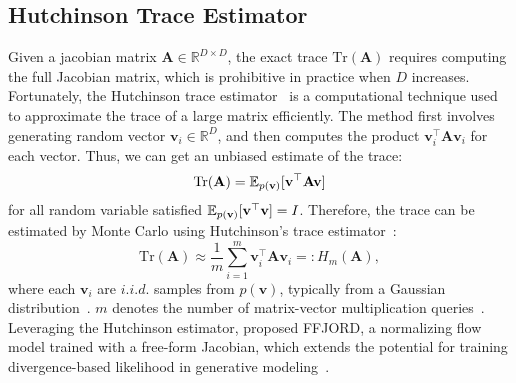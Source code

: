 \subsection{Hutchinson Trace Estimator}\label{sec: Hutchinson}
Given a jacobian matrix $\mathbf{A} \in \mathbb{R}^{D \times D}$, the exact trace $\mathrm{Tr}(\mathbf{A})$ requires computing the full Jacobian matrix,
which is prohibitive in practice when $D$ increases.
Fortunately, the Hutchinson trace estimator~\citep{Hutchinson89} is a computational technique used to approximate the trace of a large matrix efficiently. 
The method first involves generating random vector $\mathbf{v}_i \in \mathbb{R}^D$, and then computes the product $\mathbf{v}_i^\top \mathbf{A} \mathbf{v}_i$ for each vector. 
Thus, we can get an unbiased estimate of the trace:
\begin{equation}\label{eq: hutchinson_unbaised}
    \mathrm{Tr}(\mathbf{A}) = \mathbb{E}_{p(\mathbf{v})}[\mathbf{v}^\top\mathbf{A}\mathbf{v}]
\end{equation}
for all random variable satisfied $\mathbb{E}_{p(\mathbf{v})}[\mathbf{v}^\top\mathbf{v}] = I$. 
Therefore, the trace can be estimated by Monte Carlo using Hutchinson's trace estimator~\citep{Hutchinson89}:
\begin{equation}\label{eq: hutchinson}
    \mathrm{Tr}(\mathbf{A}) \approx \frac{1}{m} \sum_{i=1}^{m} \mathbf{v}_i^\top \mathbf{A} \mathbf{v}_i=:H_m(\mathbf{A}),
\end{equation}
where each $\mathbf{v}_i$ are $i.i.d.$ samples from $p(\mathbf{v})$, typically from a Gaussian distribution~\citep{Hutchinson89}. 
$m$ denotes the number of matrix-vector multiplication queries~\citep{avron2011matrixvector1, roosta2015matrixvector2}.
Leveraging the Hutchinson estimator, \citet{FFJORD} proposed FFJORD, a normalizing flow model trained with a free-form Jacobian, which extends the potential for training divergence-based likelihood in generative modeling~\citep{FFJORD,song2020sliced, forward_backward_SDE}.


